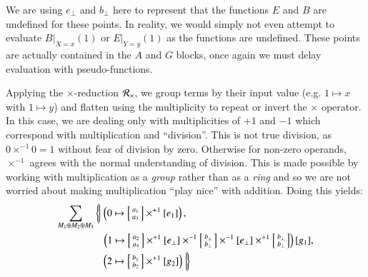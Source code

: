 We are using $e_\bot$ and $b_\bot$ here to represent that the functions $E$ and $B$ are undefined for these points.
In reality, we would simply not even attempt to evaluate $B|_{X=x}(1)$ or $E|_{Y=y}(1)$ as the functions are undefined.
These points are actually contained in the $A$ and $G$ blocks, once again we must delay evaluation with pseudo-functions.


Applying the $\times$-reduction $\R[\times]$, we group terms by their input value (e.g. $1 \mapsto x$ with $1 \mapsto y$) 
and flatten using the multiplicity to repeat or invert the $\times$ operator.
In this case, we are dealing only with multiplicities of $+1$ and $-1$ which correspond with multiplication and ``division''.
This is not true division, as $0 \times^{-1} 0 = 1$ without fear of division by zero.
Otherwise for non-zero operands, $\times^{-1}$ agrees with the normal understanding of division.
This is made possible by working with multiplication as a \emph{group} rather than as a \emph{ring}
and so we are not worried about making multiplication ``play nice'' with addition.
Doing this yields:
\begin{align*}
	\sum_{M_1 \oplus M_2 \oplus M_3}
		& \left\{\!\left|\; \left(0 \mapsto 
			\left[\begin{smallmatrix}\vphantom{b}a_1 \\ \vphantom{b}a_3 \end{smallmatrix}\right] \times^{+1} 
			[e_1] \right), \right.\right.\\
		&\;\;\;\left(1 \mapsto 
			\left[\begin{smallmatrix}\vphantom{b}a_2 \\ \vphantom{b}a_4 \end{smallmatrix}\right] \times^{+1}
			[e_\bot] \times^{-1}
			\left[\begin{smallmatrix} b_\bot \\ b_\bot \end{smallmatrix}\right] \times^{-1}
			[ e_\bot ]\times^{+1}
			\left[ \begin{smallmatrix} b_\bot \\ b_\bot \end{smallmatrix} \right] \right)
			[ g_1 ],\\
		&\;\;\left.\left.\left(2 \mapsto 
			\left[ \begin{smallmatrix} b_1 \\ b_2 \end{smallmatrix}\right]\times^{+1}
			[ g_2 ] \right) \; \right|\!\right\}
\end{align*}


